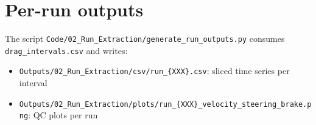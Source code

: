\documentclass[11pt,a4paper]{article}
\begin{document}
\section{Per-run outputs}
The script \texttt{Code/02\_Run\_Extraction/generate\_run\_outputs.py} consumes \texttt{drag\_intervals.csv} and writes:
\begin{itemize}
  \item \texttt{Outputs/02\_Run\_Extraction/csv/run\_\{XXX\}.csv}: sliced time series per interval
  \item \texttt{Outputs/02\_Run\_Extraction/plots/run\_\{XXX\}\_velocity\_steering\_brake.png}: QC plots per run
\end{itemize}
\end{document}
